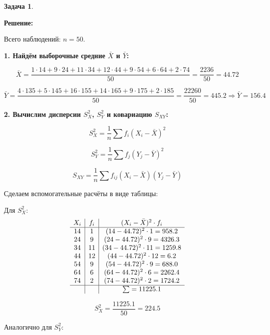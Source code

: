 \documentclass[a4paper,11pt]{article}
\newenvironment{shdd}{\begin{mdframed}[backgroundcolor=shadecolor]}{\end{mdframed}}
\theoremstyle{definition}
\newtheorem{problem}{Задача}\setlength{\parindent}{0pt}
\newenvironment{solution}
{\begin{shdd}
     \textbf{Решение:}\par\setlength{\parindent}{0pt}}
     {
\end{shdd}}
\begin{document}
\begin{problem}
\begin{solution}
            Всего наблюдений: \( n = 50 \).

            \textbf{1. Найдём выборочные средние \(\bar{X}\) и \(\bar{Y}\):}

            \[
            \bar{X} = \frac{1 \cdot 14 + 9 \cdot 24 + 11 \cdot 34 + 12 \cdot 44 + 9 \cdot 54 + 6 \cdot 64 + 2 \cdot 74}{50} = \frac{2236}{50} = 44.72
            \]

            \[
            \bar{Y} = \frac{4 \cdot 135 + 5 \cdot 145 + 16 \cdot 155 + 14 \cdot 165 + 9 \cdot 175 + 2 \cdot 185}{50} = \frac{22260}{50} = 445.2 \Rightarrow \bar{Y} = 156.4
            \]

            \textbf{2. Вычислим дисперсии \(S_X^2\), \(S_Y^2\) и ковариацию \(S_{XY}\):}

            \[
            S_X^2 = \frac{1}{n} \sum f_i (X_i - \bar{X})^2
            \]

            \[
            S_Y^2 = \frac{1}{n} \sum f_j (Y_j - \bar{Y})^2
            \]

            \[
            S_{XY} = \frac{1}{n} \sum f_{ij}(X_i - \bar{X})(Y_j - \bar{Y})
            \]

            Сделаем вспомогательные расчёты в виде таблицы:

            Для \(S_X^2\):
            \[
            \begin{array}{c|c|c}
            X_i & f_i & (X_i - \bar{X})^2 \cdot f_i \\
            \hline
            14 & 1 & (14 - 44.72)^2 \cdot 1 = 958.2 \\
            24 & 9 & (24 - 44.72)^2 \cdot 9 = 4326.3 \\
            34 & 11 & (34 - 44.72)^2 \cdot 11 = 1259.8 \\
            44 & 12 & (44 - 44.72)^2 \cdot 12 = 6.2 \\
            54 & 9 & (54 - 44.72)^2 \cdot 9 = 688.0 \\
            64 & 6 & (64 - 44.72)^2 \cdot 6 = 2262.4 \\
            74 & 2 & (74 - 44.72)^2 \cdot 2 = 1724.2 \\
            \hline
             &  & \sum = 11225.1 \\
            \end{array}
            \]

            \[
            S_X^2 = \frac{11225.1}{50} = 224.5
            \]

            Аналогично для \(S_Y^2\):


\end{solution}
\end{problem}
\end{document}
